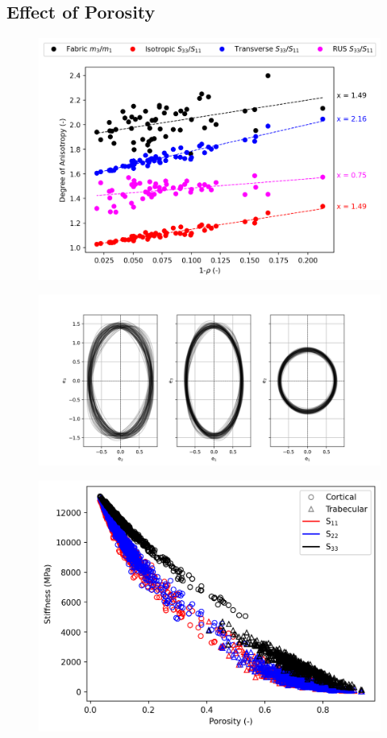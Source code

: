 \documentclass[a4paper,fleqn]{DC_ArtStyle}
\begin{document}
	\subsection{Effect of Porosity}
	\begin{figure}
		\includegraphics[width=\linewidth]{AnisotropyBVTV}
	\end{figure}

	\begin{figure}
		\includegraphics[width=\linewidth]{Fabric}
	\end{figure}

	\begin{figure}
		\includegraphics[width=\linewidth]{Stiffness}
	\end{figure}
\end{document}

